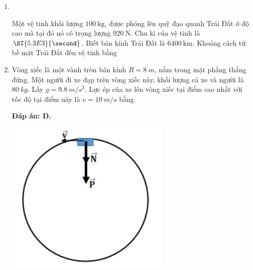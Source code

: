 \begin{enumerate}[label=\bfseries Câu \arabic*:,leftmargin=1.5cm]
	\item {}\\
	{Một vệ tinh khối lượng $\SI{100}{\kilogram}$, được phóng lên quỹ đạo quanh Trái Đất ở độ cao mà tại đó nó có trọng lượng $\SI{920}{\newton}$. Chu kì của vệ tinh là $\SI{5.3E3}{\second}$. Biết bán kính Trái Đất là $\SI{6400}{\kilo\meter}$. Khoảng cách từ bề mặt Trái Đất đến vệ tinh bằng
	\begin{mcq}(4)
		\item $\SI{135}{\kilo\meter}$.
		\item $\SI{146}{\kilo\meter}$.
		\item $\SI{185}{\kilo\meter}$.
		\item $\SI{153}{\kilo\meter}$.
	\end{mcq}
}
	
	\item {}
	
	
	{Vòng xiếc là một vành tròn bán kính $R = \SI{8}{m}$, nằm trong mặt phẳng thẳng đứng. Một người đi xe đạp trên vòng xiếc này, khối lượng cả xe và người là $\SI{80}{kg}$. Lấy $g = \SI{9,8}{m/s^2}$. Lực ép của xe lên vòng xiếc tại điểm cao nhất với tốc độ tại điểm này là $v = \SI{10}{m/s}$ bằng
	}
	
	\hideall
	{	
		\textbf{Đáp án: D.}
		
		\begin{center}
			\includegraphics[scale=0.6]{../figs/VN10-2022-PH-TP0005-1.jpg}
		\end{center}
		
}
\end{enumerate}
